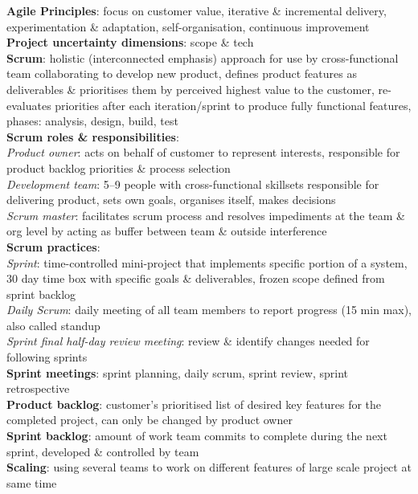 \documentclass[a4paper]{article}
\begin{document}
\begin{multicols}{3}
        \textbf{Agile Principles}: focus on customer value, iterative \& incremental delivery, experimentation \& adaptation, self-organisation, continuous improvement\\
        \textbf{Project uncertainty dimensions}: scope \& tech\\
        \textbf{Scrum}: holistic (interconnected emphasis) approach for use by cross-functional team collaborating to develop new product, defines product features as deliverables \& prioritises them by perceived highest value to the customer, re-evaluates priorities after each iteration/sprint to produce fully functional features, phases: analysis, design, build, test\\
        \textbf{Scrum roles \& responsibilities}:\\
        \textit{Product owner}: acts on behalf of customer to represent interests, responsible for product backlog priorities \& process selection\\
        \textit{Development team}: 5--9 people with cross-functional skillsets responsible for delivering product, sets own goals, organises itself, makes decisions\\
        \textit{Scrum master}: facilitates scrum process and resolves impediments at the team \& org level by acting as buffer between team \& outside interference\\
        \textbf{Scrum practices}:\\
        \textit{Sprint}: time-controlled mini-project that implements specific portion of a system, 30 day time box with specific goals \& deliverables, frozen scope defined from sprint backlog\\
        \textit{Daily Scrum}: daily meeting of all team members to report progress (15 min max), also called standup\\
        \textit{Sprint final half-day review meeting}: review \& identify changes needed for following sprints\\
        \textbf{Sprint meetings}: sprint planning, daily scrum, sprint review, sprint retrospective\\
        \textbf{Product backlog}: customer's prioritised list of desired key features for the completed project, can only be changed by product owner\\
        \textbf{Sprint backlog}: amount of work team commits to complete during the next sprint, developed \& controlled by team\\
        \textbf{Scaling}: using several teams to work on different features of large scale project at same time\\

\end{multicols}
\end{document}
